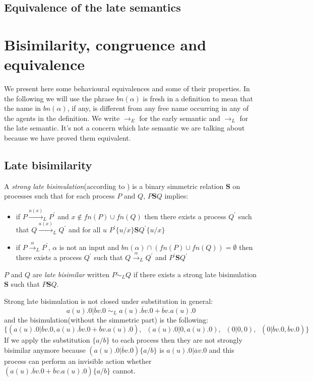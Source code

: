 \subsection{Equivalence of the late semantics}



\section{Bisimilarity, congruence and equivalence}

We present here some behavioural equivalences and some of their properties. In the following we will use the phrase $bn(\alpha)$ is fresh in a definition to mean that the name in $bn(\alpha)$, if any, is different from any free name occurring in any of the agents in the definition. We write $\rightarrow_{E}$ for the early semantic and $\rightarrow_{L}$ for the late semantic. It's not a concern which late semantic we are talking about because we have proved them equivalent.


\subsection{Late bisimilarity}

\begin{definition}
  A \emph{strong late bisimulation}(according to \cite{parrow}) is a binary simmetric relation $\mathbf{S}$ on processes such that for each process $P$ and $Q$, $P\mathbf{S}Q$ implies:
  \begin{itemize}
    \item
      if $P \xrightarrow{a(x)}_{L} P^{'}$ and $x\notin fn(P)\cup fn(Q)$ then there exists a process $Q^{'}$ such that $Q \xrightarrow{a(x)}_{L} Q^{'}$ and for all $u$ $P^{'}\{u/x\}\mathbf{S}Q^{'}\{u/x\}$
    \item 
      if $P \xrightarrow{\alpha}_{L} P^{'}$, $\alpha$ is not an input and $bn(\alpha) \cap (fn(P)\cup fn(Q)) = \emptyset$ then there exists a process $Q^{'}$ such that $Q \xrightarrow{\alpha}_{L} Q^{'}$ and $P^{'}\mathbf{S}Q^{'}$
  \end{itemize}
  $P$ and $Q$ are \emph{late bisimilar} written $P\dot{\sim}_{L}Q$ if there exists a strong late bisimulation $\mathbf{S}$ such that $P\mathbf{S}Q$.
\end{definition}

\begin{example}
  Strong late bisimulation is not closed under substitution in general:
  \[
    a(u).0|\overline{b}v.0\; \dot{\sim}_{L}\; a(u).\overline{b}v.0 + \overline{b}v.a(u).0
  \]
  and the bisimulation(without the simmetric part) is  the following:
  \[
    \{(a(u).0|\overline{b}v.0, a(u).\overline{b}v.0 + \overline{b}v.a(u).0),\;\; (a(u).0|0,a(u).0),\;\; (0|0,0),\;\; (0|\overline{b}v.0,\overline{b}v.0)\} 
  \]
  If we apply the substitution $\{a/b\}$ to each process then they are not strongly bisimilar anymore because $(a(u).0|\overline{b}v.0)\{a/b\}$ is $a(u).0|\overline{a}v.0$ and this process can perform an invisible action whether $(a(u).\overline{b}v.0 + \overline{b}v.a(u).0)\{a/b\}$ cannot.
\end{example}

